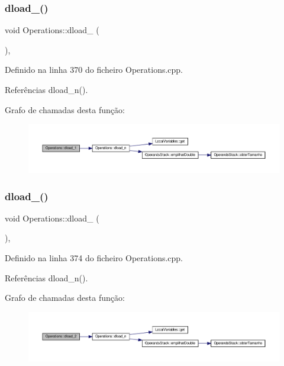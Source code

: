 \subsubsection{\texorpdfstring{dload\+\_()}{dload\_1()}}
{\footnotesize\ttfamily void Operations\+::dload\+\_ (\begin{DoxyParamCaption}{ }\end{DoxyParamCaption})\hspace{0.3cm}{\ttfamily [static]}, {\ttfamily [private]}}



Definido na linha 370 do ficheiro Operations.\+cpp.



Referências dload\+\_\+n().

Grafo de chamadas desta função\+:
\nopagebreak
\begin{figure}[H]
\begin{center}
\leavevmode
\includegraphics[width=350pt]{classOperations_a64632251d88964ff4da0d981103e099c_cgraph}
\end{center}
\end{figure}
\mbox{\label{classOperations_a55b89c1780e7f91ad7b6da5747d8c6ba}} 
\subsubsection{\texorpdfstring{dload\+\_()}{dload\_2()}}
{\footnotesize\ttfamily void Operations\+::dload\+\_ (\begin{DoxyParamCaption}{ }\end{DoxyParamCaption})\hspace{0.3cm}{\ttfamily [static]}, {\ttfamily [private]}}



Definido na linha 374 do ficheiro Operations.\+cpp.



Referências dload\+\_\+n().

Grafo de chamadas desta função\+:
\nopagebreak
\begin{figure}[H]
\begin{center}
\leavevmode
\includegraphics[width=350pt]{classOperations_a55b89c1780e7f91ad7b6da5747d8c6ba_cgraph}
\end{center}
\end{figure}
\mbox{\label{classOperations_ab3a0a107f5c4a791c71b727142a69523}} 
